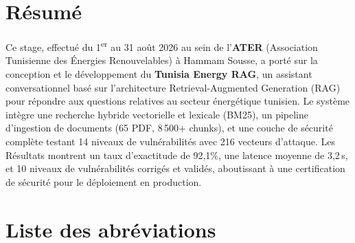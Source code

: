 \documentclass[12pt,a4paper,oneside]{report}
\begin{document}



\chapter*{R\'{e}sum\'{e}}

Ce stage, effectu\'{e} du 1\textsuperscript{er} au 31 ao\^{u}t 2026 au sein de l'\textbf{ATER} (Association Tunisienne des \'{E}nergies Renouvelables) \`{a} Hammam Sousse, a port\'{e} sur la conception et le d\'{e}veloppement du \textbf{Tunisia Energy RAG}, un assistant conversationnel bas\'{e} sur l'architecture Retrieval-Augmented Generation (RAG) pour r\'{e}pondre aux questions relatives au secteur \'{e}nerg\'{e}tique tunisien. Le syst\`{e}me int\`{e}gre une recherche hybride vectorielle et lexicale (BM25), un pipeline d'ingestion de documents (65 PDF, 8\,500+ chunks), et une couche de s\'{e}curit\'{e} compl\`{e}te testant 14 niveaux de vuln\'{e}rabilit\'{e}s avec 216 vecteurs d'attaque. Les R\'{e}sultats montrent un taux d'exactitude de 92,1\%, une latence moyenne de 3,2\,s, et 10 niveaux de vuln\'{e}rabilit\'{e}s corrig\'{e}s et valid\'{e}s, aboutissant \`{a} une certification de s\'{e}curit\'{e} pour le d\'{e}ploiement en production.



\clearpage\tableofcontents\clearpage\listoffigures\listoftables\clearpage






\chapter*{Liste des abr\'{e}viations}
\end{document}
